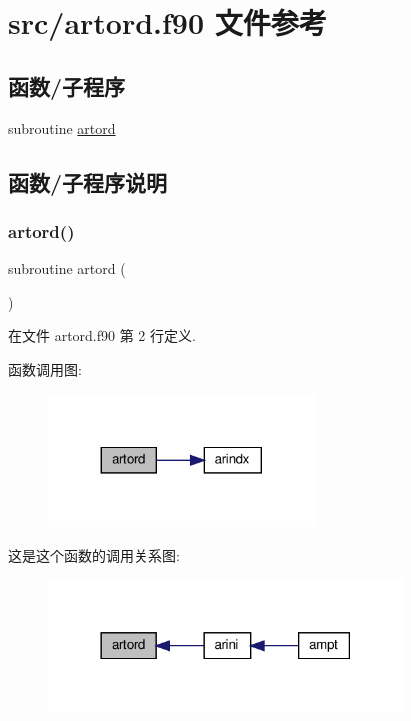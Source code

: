 \hypertarget{artord_8f90}{}\section{src/artord.f90 文件参考}
\label{artord_8f90}
\subsection*{函数/子程序}
\begin{DoxyCompactItemize}
\item 
subroutine \mbox{\hyperlink{artord_8f90_a296ee74a425b71e1c838a5f6a41f4fb0}{artord}}
\end{DoxyCompactItemize}


\subsection{函数/子程序说明}
\mbox{\label{artord_8f90_a296ee74a425b71e1c838a5f6a41f4fb0}} 
\subsubsection{\texorpdfstring{artord()}{artord()}}
{\footnotesize\ttfamily subroutine artord (\begin{DoxyParamCaption}{ }\end{DoxyParamCaption})}



在文件 artord.\+f90 第 2 行定义.

函数调用图\+:
\nopagebreak
\begin{figure}[H]
\begin{center}
\leavevmode
\includegraphics[width=200pt]{artord_8f90_a296ee74a425b71e1c838a5f6a41f4fb0_cgraph}
\end{center}
\end{figure}
这是这个函数的调用关系图\+:
\nopagebreak
\begin{figure}[H]
\begin{center}
\leavevmode
\includegraphics[width=266pt]{artord_8f90_a296ee74a425b71e1c838a5f6a41f4fb0_icgraph}
\end{center}
\end{figure}
